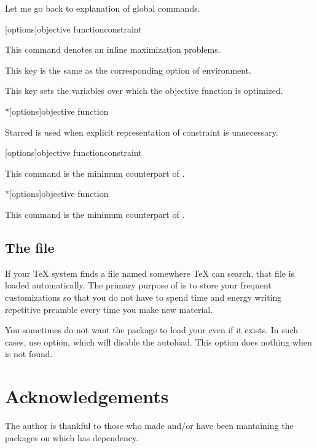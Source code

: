 \documentclass[a4paper,10pt]{article}
\begin{document}
Let me go back to explanation of global commands.
\begin{ltxsyntax}
    [options]{objective function}{constraint}\par
    This command denotes an inline maximization problems.
    \begin{optionlist}
        This key is the same as the corresponding option of  environment.

        This key sets the variables over which the objective function is optimized.
    \end{optionlist}

    *[options]{objective function}\par
    Starred  is used when explicit representation of constraint is unnecessary.

    [options]{objective function}{constraint}\par

    This command is the minimum counterpart of .

    *[options]{objective function}\par
    This command is the minimum counterpart of .
\end{ltxsyntax}

\subsection{The  file} \label{ssec:optprobcfg}
If your \TeX{} system finds a file named  somewhere \TeX{} can search, that file is loaded automatically.
The primary purpose of  is to store your frequent customizations so that you do not have to spend time and energy writing repetitive preamble every time you make new material.

You sometimes do not want the package to load your  even if it exists.
In such cases, use  option, which will disable the autoload. This option does nothing when  is not found.

\section{Acknowledgements}
The author is thankful to those who made and/or have been mantaining the packages on which  has dependency.
\end{document}
